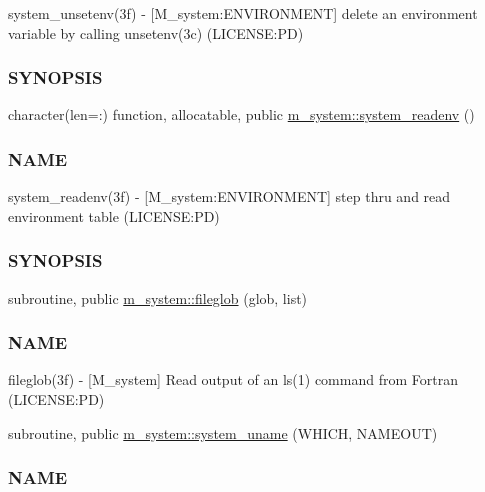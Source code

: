\begin{DoxyCompactItemize}
\begin{DoxyCompactList}
system\+\_\+unsetenv(3f) -\/ \mbox{[}M\+\_\+system\+:E\+N\+V\+I\+R\+O\+N\+M\+E\+NT\mbox{]} delete an environment variable by calling unsetenv(3c) (L\+I\+C\+E\+N\+SE\+:PD) \subsubsection*{S\+Y\+N\+O\+P\+S\+IS}\end{DoxyCompactList}\item 
character(len=\+:) function, allocatable, public \mbox{\hyperlink{namespacem__system_ae0e43010a82a6a25402568ccb326322d}{m\+\_\+system\+::system\+\_\+readenv}} ()
\begin{DoxyCompactList}\small\item\em \subsubsection*{N\+A\+ME}

system\+\_\+readenv(3f) -\/ \mbox{[}M\+\_\+system\+:E\+N\+V\+I\+R\+O\+N\+M\+E\+NT\mbox{]} step thru and read environment table (L\+I\+C\+E\+N\+SE\+:PD) \subsubsection*{S\+Y\+N\+O\+P\+S\+IS}\end{DoxyCompactList}\item 
subroutine, public \mbox{\hyperlink{namespacem__system_a79656f76ad75168302e0d770052e901e}{m\+\_\+system\+::fileglob}} (glob, list)
\begin{DoxyCompactList}\small\item\em \subsubsection*{N\+A\+ME}

fileglob(3f) -\/ \mbox{[}M\+\_\+system\mbox{]} Read output of an ls(1) command from Fortran (L\+I\+C\+E\+N\+SE\+:PD) \end{DoxyCompactList}\item 
subroutine, public \mbox{\hyperlink{namespacem__system_a04e5d49509c44bcb2ccabfd80ec8cdfb}{m\+\_\+system\+::system\+\_\+uname}} (W\+H\+I\+CH, N\+A\+M\+E\+O\+UT)
\begin{DoxyCompactList}\small\item\em \subsubsection*{N\+A\+ME}


\end{DoxyCompactList}
\end{DoxyCompactItemize}
